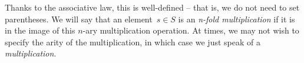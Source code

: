 
Thanks to the associative law, this is well-defined -- that is, we do not need to set parentheses.
We will say that an element~$s \in S$ is an \emph{n-fold multiplication} if it is in the image of this $n$-ary multiplication operation.
At times, we may not wish to specify the arity of the multiplication, in which case we just speak of a \emph{multiplication}.

\devel{\begin{forslides}
         \begin{equation}
           \label{eq:mora}
           \mora
         \end{equation}
         \begin{equation}
           \label{eq:morb}
           \morb
         \end{equation}
         \begin{equation}
           \label{eq:morab}
           \mora\then\morb
         \end{equation}

\end{forslides}}
